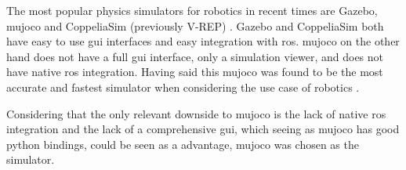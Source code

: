 The most popular physics simulators for robotics in recent times are Gazebo, \ac{mujoco} and CoppeliaSim (previously V-REP) \citep{Collins-2021}.
Gazebo and CoppeliaSim both have easy to use \ac{gui} interfaces and easy integration with \ac{ros}. \ac{mujoco} on the other hand does not have
a full \ac{gui} interface, only a simulation viewer, and does not have native \ac{ros} integration. Having said this \ac{mujoco} was found to be
the most accurate and fastest simulator when considering the use case of robotics \citep{Erez-2015}.

Considering that the only relevant downside to \ac{mujoco} is the lack of native \ac{ros} integration and the lack of a comprehensive \ac{gui},
which seeing as \ac{mujoco} has good python bindings, could be seen as a advantage, \ac{mujoco} was chosen as the simulator.
